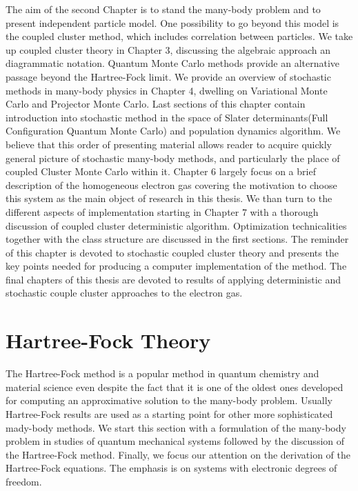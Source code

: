 \documentclass[twoside,english]{uiofysmaster}
\begin{document}
The aim of the second Chapter is to stand the many-body problem and to present independent particle model. One possibility to go beyond this model is the coupled cluster method, which includes correlation between particles.
We take up coupled cluster theory in Chapter 3, discussing the algebraic approach an diagrammatic notation.
Quantum Monte Carlo methods provide an alternative passage beyond the Hartree-Fock limit. We provide an overview of stochastic methods in many-body physics in Chapter 4, dwelling on Variational Monte Carlo and Projector Monte Carlo.
Last sections of this chapter contain introduction into stochastic method in the space of Slater determinants(Full Configuration Quantum Monte Carlo) and population dynamics algorithm.
We believe that this order of presenting material allows reader to acquire quickly general picture of stochastic many-body methods, and particularly the place of coupled Cluster Monte Carlo within it.
Chapter 6 largely focus on a brief description of the homogeneous electron gas covering the motivation to choose this system as the main object of research in this thesis.
We than turn to the different aspects of implementation starting in Chapter 7 with a thorough discussion of coupled cluster deterministic algorithm.
Optimization technicalities together with the class structure are discussed in the first sections. The reminder of this chapter is devoted to stochastic coupled cluster theory and presents the key points needed for producing a computer implementation of the method.
The final chapters of this thesis are devoted to results of applying deterministic and stochastic couple cluster approaches to the electron gas. 




\chapter{Hartree-Fock Theory}\label{Ch:HF}


The Hartree-Fock method is a popular method in quantum chemistry and
material science even despite the fact that it is one of the oldest
ones developed for computing an approximative solution to the
many-body problem. Usually Hartree-Fock results are used as a starting
point for other more sophisticated mady-body methods.  We start this
section with a formulation of the many-body problem in studies of quantum
mechanical systems followed by the discussion of the
Hartree-Fock method. Finally, we focus our attention on the derivation of the
Hartree-Fock equations.  The emphasis is on systems with electronic degrees of freedom.
\end{document}
